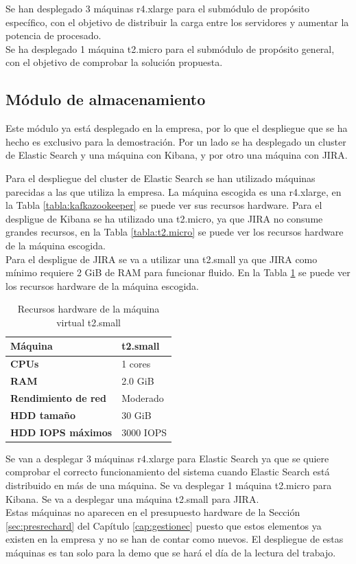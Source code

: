 Se han desplegado 3 máquinas r4.xlarge para el submódulo de propósito específico, con el objetivo de distribuir la carga entre los servidores y aumentar la potencia de procesado.
\\
Se ha desplegado 1 máquina t2.micro para el submódulo de propósito general, con el objetivo de comprobar la solución propuesta.

\subsection{Módulo de almacenamiento}
Este módulo ya está desplegado en la empresa, por lo que el despliegue que se ha hecho es exclusivo para la demostración. Por un lado se ha desplegado un cluster de Elastic Search y una máquina con Kibana, y por otro una máquina con JIRA.

Para el despliegue del cluster de Elastic Search se han utilizado máquinas parecidas a las que utiliza la empresa. La máquina escogida es una r4.xlarge, en la Tabla \ref{tabla:kafkazookeeper} se puede ver sus recursos hardware. Para el despligue de Kibana se ha utilizado una t2.micro, ya que JIRA no consume grandes recursos, en la Tabla \ref{tabla:t2.micro} se puede ver los recursos hardware de la máquina escogida.
\\
Para el despligue de JIRA se va a utilizar una t2.small ya que JIRA como mínimo requiere 2 GiB de RAM para funcionar fluido. En la Tabla \ref{tabla:t2.small} se puede ver los recursos hardware de la máquina escogida.

\begin{table}[H]\label{tabla:t2.small}
	\centering
	\begin{tabular}{|l|l|}
		\hline
		\textbf{Máquina}            & \textbf{t2.small}      \\ \hline
		\textbf{CPUs}               & 1 cores                \\ \hline
		\textbf{RAM}                & 2.0 GiB                \\ \hline
		\textbf{Rendimiento de red} & Moderado               \\ \hline
		\textbf{HDD tamaño}         & 30 GiB                 \\ \hline
		\textbf{HDD IOPS máximos}   & 3000 IOPS              \\ \hline
	\end{tabular}
	\caption{Recursos hardware de la máquina virtual t2.small}
\end{table}

Se van a desplegar 3 máquinas r4.xlarge para Elastic Search ya que se quiere comprobar el correcto funcionamiento del sistema cuando Elastic Search está distribuido en más de una máquina. Se va desplegar 1 máquina t2.micro para Kibana. Se va a desplegar una máquina t2.small para JIRA. 
\\
Estas máquinas no aparecen en el presupuesto hardware de la Sección \ref{sec:presrechard} del Capítulo \ref{cap:gestionec} puesto que estos elementos ya existen en la empresa y no se han de contar como nuevos. El despliegue de estas máquinas es tan solo para la demo que se hará el día de la lectura del trabajo.

